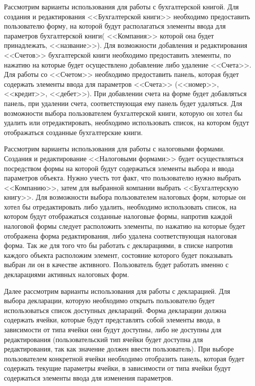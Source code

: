 \documentclass[14pt,a4paper]{reportmod}
\begin{document}
Рассмотрим варианты использования для работы с бухгалтерской книгой. Для создания и редактирования <<Бухгалтерской книги>> необходимо предоставить пользователю форму, на которой будут располагаться элементы ввода для параметров бухгалтерской книги( <<Компания>> которой она будет принадлежать, <<название>>). Для возможности добавления и редактирования <<Счетов>> бухгалтерской книги необходимо предоставить элементы, по нажатию на которые будет осуществлено добавление либо удаление <<Счета>>. Для работы со <<Счетом>> необходимо предоставить панель, которая будет содержать элементы ввода для параметров <<Счета>> (<<номер>>, <<кредит>>, <<дебет>>). При добавлении счета на форме будет добавляться панель, при удалении счета, соответствующая ему панель будет удаляться.
Для возможности выбора пользователем бухгалтерской книги, которую он хотел бы удалить или отредактировать, необходимо использовать список, на котором будут отображаться созданные бухгалтерские книги.

Рассмотрим варианты использования для работы с налоговыми формами. Создания и редактирование <<Налоговыми формами>> будет осуществляться посредством формы на которой будут содержаться элементы выбора и ввода параметров объекта. Нужно учесть тот факт, что пользователю нужно выбрать <<Компанию>>, затем для выбранной компании выбрать <<Бухгалтерскую книгу>>.
Для возможности выбора пользователем налоговых форм, которые он хотел бы отредактировать либо удалить, необходимо использовать список, на котором будут отображаться созданные налоговые формы, напротив каждой налоговой формы следует расположить элементы, по нажатию на которые будет отображена форма редактирования, либо удалена соответствующая налоговая форма. Так же для того что бы работать с декларациями, в списке напротив каждого объекта расположим элемент, состояние которого будет показывать выбран ли он в качестве активного. Пользователь будет работать именно с декларациями активных налоговых форм.

Далее рассмотрим варианты использования для работы с декларацией. Для выбора декларации, которую необходимо открыть пользователю будет использоваться список доступных деклараций. Форма декларации должна содержать ячейки, которые будут представлять собой элементы ввода, в зависимости от типа ячейки они будут доступны, либо не доступны для редактирования (пользовательский тип ячейки будет доступна для редактирования, так как значение должен ввести пользователь). При выборе пользователем конкретной ячейки необходимо отобразить панель, которая будет содержать текущие параметры ячейки, в зависимости от типа ячейки будут содержаться элементы ввода для изменения параметров.
\end{document}
